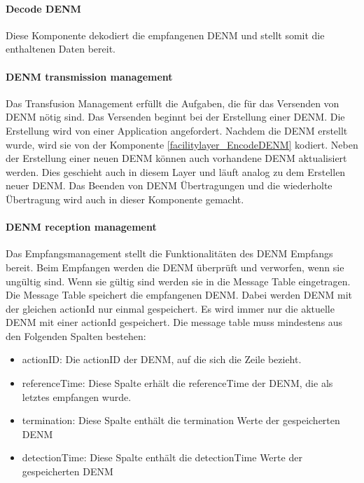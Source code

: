 \paragraph{Decode DENM}
Diese Komponente dekodiert die empfangenen \ac{DENM} und stellt somit die enthaltenen Daten bereit.

\paragraph{DENM transmission management}
Das Transfusion Management erfüllt die Aufgaben, die für das Versenden von \ac{DENM} nötig sind. Das Versenden beginnt bei der Erstellung einer \ac{DENM}. Die Erstellung wird von einer Application angefordert. Nachdem die \ac{DENM} erstellt wurde, wird sie von der Komponente \ref{facilitylayer_EncodeDENM} kodiert. Neben der Erstellung einer neuen \ac{DENM} können auch vorhandene \ac{DENM} aktualisiert werden. Dies geschieht auch in diesem Layer und läuft analog zu dem Erstellen neuer \ac{DENM}. Das Beenden von \ac{DENM} Übertragungen und die wiederholte Übertragung wird auch in dieser Komponente gemacht.

\paragraph{DENM reception management}
Das Empfangsmanagement stellt die Funktionalitäten des \ac{DENM} Empfangs bereit. Beim Empfangen werden die \ac{DENM} überprüft und verworfen, wenn sie ungültig sind. Wenn sie gültig sind werden sie in die Message Table eingetragen. Die Message Table speichert die empfangenen \ac{DENM}. Dabei werden \ac{DENM} mit der gleichen actionId nur einmal gespeichert. Es wird immer nur die aktuelle \ac{DENM} mit einer actionId gespeichert. Die message table muss mindestens aus den Folgenden Spalten bestehen:

\begin{itemize}
	\item actionID: Die actionID der \ac{DENM}, auf die sich die Zeile bezieht.
	\item referenceTime: Diese Spalte erhält die referenceTime der \ac{DENM}, die als letztes empfangen wurde. 
	\item termination: Diese Spalte enthält die termination Werte der gespeicherten \ac{DENM}
	\item detectionTime: Diese Spalte enthält die detectionTime Werte der gespeicherten \ac{DENM}
\end{itemize}
 
